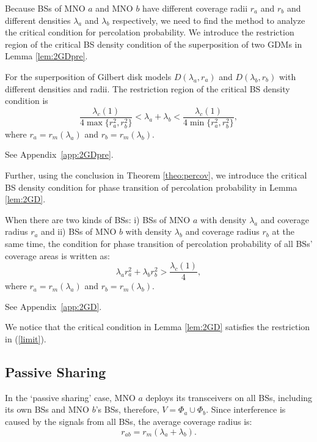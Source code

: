 \documentclass[final]{IEEEtran}
\begin{document}
\indent Because BSs of MNO $a$ and MNO $b$ have different coverage radii $r_{a}$ and $r_{b}$ and different densities $\lambda_a$ and $\lambda_b$ respectively, we need to find the method to analyze the critical condition for percolation probability. We introduce the restriction region of the critical BS density condition of the superposition of two GDMs in Lemma \ref{lem:2GDpre}.
\begin{lemma}\label{lem:2GDpre}
    For the superposition of Gilbert disk models $D(\lambda_a,r_{a})$ and $D(\lambda_b,r_{b})$ with different densities and radii. The restriction region of the critical BS density condition is
    \begin{equation}\label{limit}
        \frac{\lambda_c(1)}{4\max\{r_{a}^2,r_{b}^2\}}<\lambda_a+\lambda_b<\frac{\lambda_c(1)}{4\min\{r_{a}^2,r_{b}^2\}},
    \end{equation}
where $r_{a}=r_{m}(\lambda_a)$ and $r_{b}=r_{m}(\lambda_b)$.
\end{lemma}
\begin{IEEEproof}
    See Appendix~\ref{app:2GDpre}.
\end{IEEEproof}

Further, using the conclusion in Theorem \ref{theo:percov}, we introduce the critical BS density condition for phase transition of percolation probability in Lemma \ref{lem:2GD}.
\begin{lemma}\label{lem:2GD}
    When there are two kinds of BSs: i) BSs of MNO $a$ with density $\lambda_a$ and coverage radius $r_{a}$ and ii) BSs of MNO $b$ with density $\lambda_b$ and coverage radius $r_{b}$ at the same time, the condition for phase transition of percolation probability of all BSs' coverage areas is written as:
\begin{equation}
    \lambda_a r_{a}^2+\lambda_b r_{b}^2>\frac{\lambda_c(1)}{4},
\end{equation}
where $r_{a}=r_{m}(\lambda_a)$ and $r_{b}=r_{m}(\lambda_b)$.
\end{lemma}
\begin{IEEEproof}
    See Appendix~{\ref{app:2GD}}.
\end{IEEEproof}
\indent We notice that the critical condition in Lemma \ref{lem:2GD} satisfies the restriction in (\ref{limit}). 

\subsection{Passive Sharing}
\indent In the `passive sharing' case, MNO $a$ deploys its transceivers on all BSs, including its own BSs and MNO $b$'s BSs, therefore, $V=\Phi_a\cup\Phi_b$. Since interference is caused by the signals from all BSs, the average coverage radius is:
\begin{equation}
    r_{ab} = r_m(\lambda_a+\lambda_b).
\end{equation}
\end{document}
